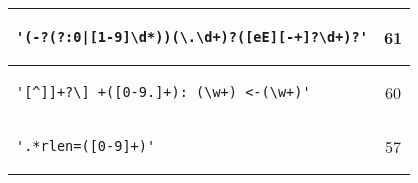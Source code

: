 \begin{table}
\begin{center}
\begin{tabular}{lc}
\begin{minipage}{2.4in}
\begin{verbatim}
'(-?(?:0|[1-9]\d*))(\.\d+)?([eE][-+]?\d+)?'\end{verbatim}
\end{minipage}
& 61 \\ 
\midrule
\begin{minipage}{2.4in}
\begin{verbatim}
'[^]]+?\] +([0-9.]+): (\w+) <-(\w+)'\end{verbatim}
\end{minipage}
& 60 \\ 
\midrule
\begin{minipage}{2.4in}
\begin{verbatim}
'.*rlen=([0-9]+)'\end{verbatim}
\end{minipage}
& 57 \\ 
\bottomrule
\end{tabular}
\end{center}
\end{table}
